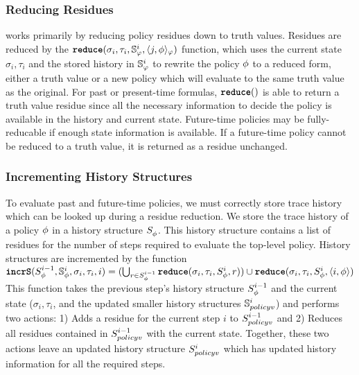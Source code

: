 \subsubsection{Reducing Residues}
\monitor works primarily by reducing policy residues down to truth values. Residues are reduced by the $\reduce(\sigma_i, \tau_i, \histSt{i}, \rpt{j}{\policyv}{\policy})$ function, which uses the current state $\sigma_i,\tau_i$ and the stored history in $\histSt{i}$ to rewrite the policy $\policyv$ to a reduced form, either a truth value or a new policy which will evaluate to the same truth value as the original. For past or present-time formulas, $\reduce()$ is able to return a truth value residue since all the necessary information to decide the policy is available in the history and current state. Future-time policies may be fully-reducable if enough state information is available. If a future-time policy cannot be reduced to a truth value, it is returned as a residue unchanged.

\subsubsection{Incrementing History Structures}
To evaluate past and future-time policies, we must correctly store trace history which can be looked up during a residue reduction. 
We store the trace history of a policy $\policyv$ in a history structure $\histst[\policyv]{}$. 
This history structure contains a list of residues for the number of steps required to evaluate the top-level policy. History structures are incremented by the function 
$\incrS(\histst[\policyv]{i-1}, \histSt[\policyv]{i}, \sigma_i, \tau_i, i) = (\bigcup_{r \in \histst[\policyv]{i-1}} \reduce(\sigma_i, \tau_i, \histst[\policyv]{i}, r)) \cup \reduce(\sigma_i, \tau_i, \histst[\policyv]{i}, \rp{i}{\policyv})$
%
This function takes the previous step's history structure $\histst[\policyv]{i-1}$ and the current state ($\sigma_i,\tau_i$, and the updated smaller history structures $\histSt[policyv]{i}$) and performs two actions:
	1) Adds a residue for the current step $i$ to $\histst[policyv]{i-1}$ and
	2) Reduces all residues contained in $\histst[policyv]{i-1}$ with the current state.
Together, these two actions leave an updated history structure $\histst[policyv]{i}$ which has updated history information for all the required steps.

